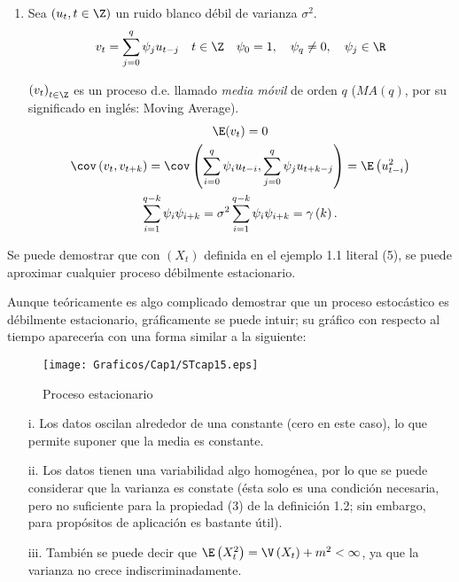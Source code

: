 \begin{ejemplo}
\begin{enumerate}
\item Sea $\left(u_{t} ,t\in \Z \right)$ un ruido blanco d\'{e}bil de varianza $\sigma^{2}$.
\[
	v_{t} =\sum_{j=0}^q {\psi_{j} u_{t-j} } \quad t\in \Z \quad \psi_{0} =1, \quad \psi_{q} \neq 0, \quad \psi_{j} \in \R
\]

$\left( {v_{t} } \right)_{t\in \Z} $ es un proceso d.e. llamado \emph{media m\'{o}vil} de orden $q$ ($MA(q)$, por su significado en ingl\'{e}s: Moving Average).
\begin{gather*}
	\E(v_{t}) =0\\
	\cov\left( {v_{t} ,v_{t+k} } \right)=\cov\left(\sum_{i=0}^q \psi_{i} u_{t-i},\sum_{j=0}^q \psi_{j} u_{t+k-j} \right)=\E\left({u_{t-i}^{2} } \right)\\
	\sum_{i=1}^{q-k} \psi_{i} \psi_{i+k}  =\sigma^{2}\sum_{i=1}^{q-k} \psi_{i} \psi_{i+k} =\gamma \left( k \right).
\end{gather*}

\end{enumerate}
\end{ejemplo}

\begin{observacion}
Se puede demostrar que con $\left( X_{t} \right)$ definida en el ejemplo 1.1 literal (5), se puede aproximar cualquier proceso d\'{e}bilmente estacionario.
\end{observacion}

Aunque te\'{o}ricamente es algo complicado demostrar que un proceso estoc\'{a}stico es d\'{e}bilmente estacionario, gr\'{a}ficamente se puede intuir; su gr\'{a}fico con respecto al tiempo aparecer\'{\i}a con una forma similar a la siguiente:

\begin{figure}[H]
\centering
\texttt{[image: Graficos/Cap1/STcap15.eps]}
\caption{Proceso estacionario}
\end{figure}

\begin{enumerate}
\item[i.] Los datos oscilan alrededor de una constante (cero en este caso), lo que permite suponer que la media es constante.
\item[ii.] Los datos tienen una variabilidad algo homog\'{e}nea, por lo que se puede considerar que la varianza es constate (\'{e}sta solo es una condici\'{o}n necesaria, pero no suficiente para la propiedad (3) de la definici\'{o}n 1.2; sin embargo, para prop\'{o}sitos de aplicaci\'{o}n es bastante \'{u}til).
\item[iii.] Tambi\'{e}n se puede decir que $\E\left( X_{t}^{2} \right)=\V\left( X_{t} \right)+m^{2}<\infty $, ya que la varianza no crece indiscriminadamente.
\end{enumerate}

